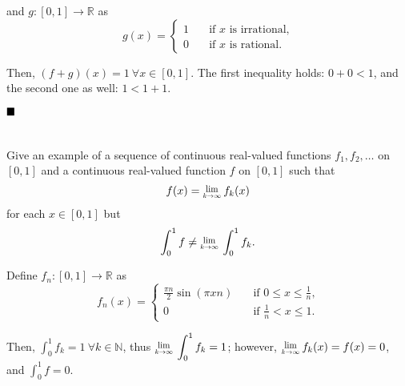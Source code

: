 \documentclass[11pt, a4paper, tikz]{article}
\newcommand{\centsection}[1]{
	\section*{\centering{#1}}
}
\renewcommand{\qed}{\hfill\blacksquare}
\newcommand{\Lim}[1]{\raisebox{0.5ex}{\scalebox{0.8}{$\displaystyle \lim_{#1}\;$}}}
\newcommand{\Int}[2]{\displaystyle \int_{#1}^{#2}}
\newcommand{\naturals}{
	\ensuremath{\mathbb{N}}
}
\newcommand{\reals}{
	\ensuremath{\mathbb{R}}
}
\begin{document}
	and $g:[0,1]\rightarrow\reals$ as
	\[
		g(x) =
		\begin{cases}
			1 &\quad \textrm{if $x$ is irrational,}\\
			0 &\quad \textrm{if $x$ is rational.}
		\end{cases}
	\]
	
	Then, $(f+g)(x) = 1\ \forall x\in[0,1]$. The first inequality holds: $0 + 0 < 1$, and the second one as well: $1 < 1 + 1$.
	
	$\qed$
	
	\centsection{Exercise 5}
	
	\begin{formulationBox}
		Give an example of a sequence of continuous real-valued functions $f_1, f_2, \dots$ on $[0,1]$ and a continuous real-valued function $f$ on $[0,1]$ such that \[f(x)=\Lim{k\rightarrow\infty}f_k(x)\] for each $x\in[0,1]$ but \[\Int{0}{1}f \neq \Lim{k\rightarrow\infty}\Int{0}{1}f_k.\]
	\end{formulationBox}
	
	Define $f_n:[0,1]\rightarrow\reals$ as
	\[
		f_n(x) =
		\begin{cases}
			\frac{\pi n}{2}\sin(\pi xn) &\quad \textrm{if $0\leq x\leq \frac{1}{n}$,}\\
			0 &\quad \textrm{if $\frac{1}{n} < x \leq 1$.}
		\end{cases}
	\]
	
	Then, $\Int{0}{1}f_k = 1\ \forall k\in\naturals$, thus $\Lim{k\rightarrow\infty}\Int{0}{1}f_k = 1$; however, $\Lim{k\rightarrow\infty}f_k(x) = f(x) = 0$, and $\Int{0}{1}f = 0$.
\end{document}
